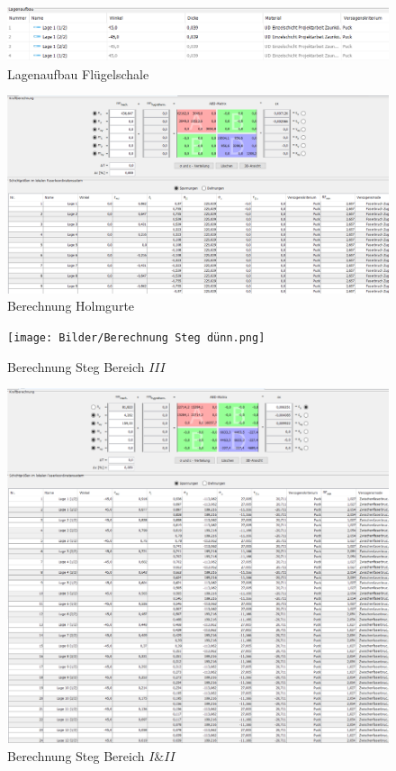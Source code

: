 \begin{figure}
	\includegraphics[width=1.0\textwidth]{Bilder/Lagenaufbau Haut.png}
	\caption{Lagenaufbau Flügelschale}
	\label{fig:Lagenaufbau Haut}
\end{figure}
\begin{figure}
	\includegraphics[width=1.0\textwidth]{Bilder/Berechnung Holmgurte.png}
	\caption{Berechnung Holmgurte}
	\label{fig:Berechnung Holmgurte}
\end{figure}
\begin{figure}
	\texttt{[image: Bilder/Berechnung Steg dünn.png]}
	\caption{Berechnung Steg Bereich $III$}
	\label{fig:Berechnung Steg dünn}
\end{figure}
\begin{figure}
	\includegraphics[width=1.0\textwidth]{Bilder/Berechnung Steg dick.png}
	\caption{Berechnung Steg Bereich $I$\&$II$}
	\label{fig:Berechnung Steg dick}
\end{figure}
